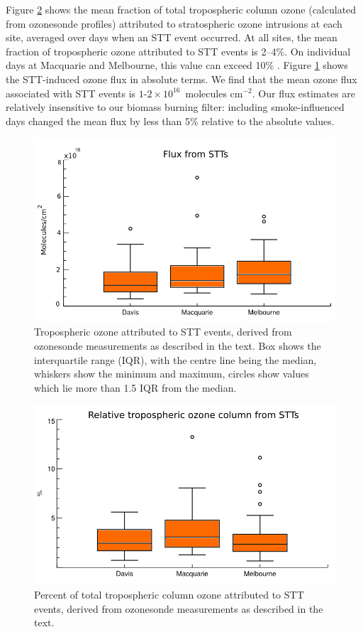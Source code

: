 \documentclass{article}
\begin{document}
  Figure \ref{fig:fluxsummary} shows the mean fraction of total tropospheric column ozone (calculated from ozonesonde profiles) attributed to stratospheric ozone intrusions at each site, averaged over days when an STT event occurred.
  At all sites, the mean fraction of tropospheric ozone attributed to STT events is 2--4\%. On individual days at Macquarie and Melbourne, this value can exceed 10\% .
  Figure \ref{fig:fluxsummaryabs} shows the STT-induced ozone flux in absolute terms.
  We find that the mean ozone flux associated with STT events is $1$-$2 \times 10^{16}$~molecules cm$^{-2}$.
  Our flux estimates are relatively insensitive to our biomass burning filter: including smoke-influenced days changed the mean flux by less than 5\% relative to the absolute values.
  
  \begin{figure}[!htbp]
    \begin{center}
    \includegraphics[width=0.8\columnwidth]{figures/flux_absolute.png}
    \caption{Tropospheric ozone attributed to STT events, derived from ozonesonde measurements as described in the text.
      Box shows the interquartile range (IQR), with the centre line being the median, whiskers show the minimum and maximum, circles show values which lie more than 1.5 IQR from the median.}
    \label{fig:fluxsummaryabs}
    \end{center}
  \end{figure}
  \begin{figure}[!htbp]
    \begin{center}
    \includegraphics[width=0.8\columnwidth]{figures/flux_relative.png}
    \caption{Percent of total tropospheric column ozone attributed to STT events, derived from ozonesonde measurements as described in the text.}
    \label{fig:fluxsummary}
    \end{center}
  \end{figure}
  
\end{document}
